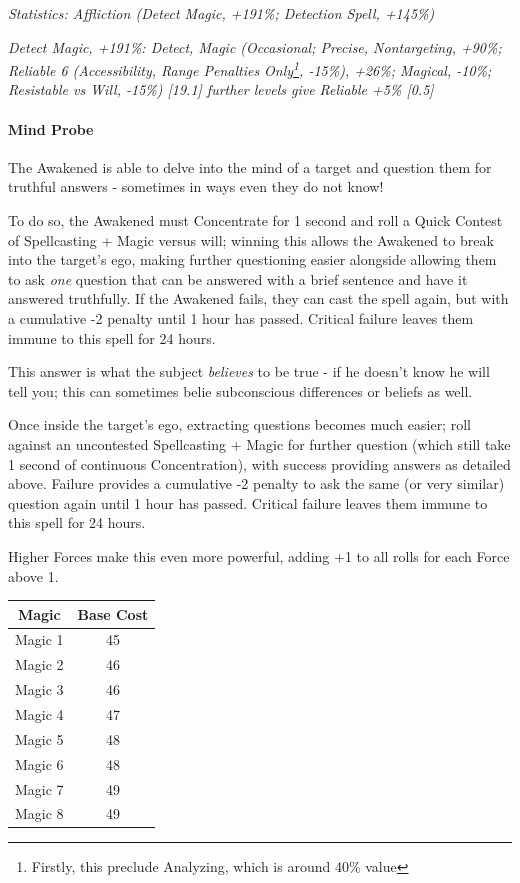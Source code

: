 \begin{multicols*}{3}
	\textcolor{OliveGreen}{\textit{ Statistics: Affliction (Detect Magic, +191\%; Detection Spell, +145\%) }}
	
	\textcolor{OliveGreen}{\textit{Detect Magic, +191\%: Detect, Magic (Occasional; Precise, Nontargeting, +90\%; Reliable 6 (Accessibility, Range Penalties Only\footnote{Firstly, this preclude Analyzing, which is around 40\% value}, -15\%), +26\%; Magical, -10\%; Resistable vs Will, -15\%) [19.1] further levels give Reliable +5\% [0.5]}}
		
	\paragraph{Mind Probe}
	
	The Awakened is able to delve into the mind of a target and question them for truthful answers - sometimes in ways even they do not know!
	
	To do so, the Awakened must Concentrate for 1 second and roll a Quick Contest of Spellcasting + Magic versus will; winning this allows the Awakened to break into the target's ego, making further questioning easier alongside allowing them to ask \textit{one} question that can be answered with a brief sentence and have it answered truthfully. If the Awakened fails, they can cast the spell again, but with a cumulative -2 penalty until 1 hour has passed. Critical failure leaves them immune to this spell for 24 hours.
	
	This answer is what the subject \textit{believes} to be true - if he doesn't know he will tell you; this can sometimes belie subconscious differences or beliefs as well.
	
	Once inside the target's ego, extracting questions becomes much easier; roll against an uncontested Spellcasting + Magic for further question (which still take 1 second of continuous Concentration), with success providing answers as detailed above. Failure provides a cumulative -2 penalty to ask the same (or very similar) question again until 1 hour has passed. Critical failure leaves them immune to this spell for 24 hours.
 	
 	Higher Forces make this even more powerful, adding +1 to all rolls for each Force above 1.
 	
	\begin{center}
		\begin{tabular}{|c|c|}
			\hline
			Magic & Base Cost \\
			\hline
			\hline
			Magic 1 & 45 \\
			Magic 2 & 46 \\
			Magic 3 & 46 \\
			Magic 4 & 47 \\
			Magic 5 & 48 \\
			Magic 6 & 48 \\
			Magic 7 & 49 \\
			Magic 8 & 49 \\
			\hline
		\end{tabular}
	\end{center} 
	

\end{multicols*}
